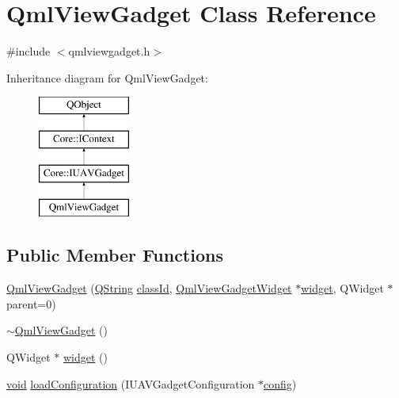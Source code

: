 \hypertarget{class_qml_view_gadget}{\section{Qml\-View\-Gadget Class Reference}
\label{class_qml_view_gadget}
}


{\ttfamily \#include $<$qmlviewgadget.\-h$>$}

Inheritance diagram for Qml\-View\-Gadget\-:\begin{figure}[H]
\begin{center}
\leavevmode
\includegraphics[height=4.000000cm]{class_qml_view_gadget}
\end{center}
\end{figure}
\subsection*{Public Member Functions}
\begin{DoxyCompactItemize}
\item 
\hyperlink{group___o_p_map_plugin_ga20a7caf16d8ece4d83abc6c96c5a6556}{Qml\-View\-Gadget} (\hyperlink{group___u_a_v_objects_plugin_gab9d252f49c333c94a72f97ce3105a32d}{Q\-String} \hyperlink{group___core_plugin_ga3878fde66a57220608960bcc3fbeef2c}{class\-Id}, \hyperlink{class_qml_view_gadget_widget}{Qml\-View\-Gadget\-Widget} $\ast$\hyperlink{group___o_p_map_plugin_ga7687b494af7a9e5b6f9550ff75f4a98c}{widget}, Q\-Widget $\ast$parent=0)
\item 
\hyperlink{group___o_p_map_plugin_gacae7d443d2a8754279dd055180fc2622}{$\sim$\-Qml\-View\-Gadget} ()
\item 
Q\-Widget $\ast$ \hyperlink{group___o_p_map_plugin_ga7687b494af7a9e5b6f9550ff75f4a98c}{widget} ()
\item 
\hyperlink{group___u_a_v_objects_plugin_ga444cf2ff3f0ecbe028adce838d373f5c}{void} \hyperlink{group___o_p_map_plugin_ga38c57a339a1bd7d6c6295d9f4fdcd016}{load\-Configuration} (I\-U\-A\-V\-Gadget\-Configuration $\ast$\hyperlink{deflate_8c_a4473b5227787415097004fd39f55185e}{config})
\end{DoxyCompactItemize}

